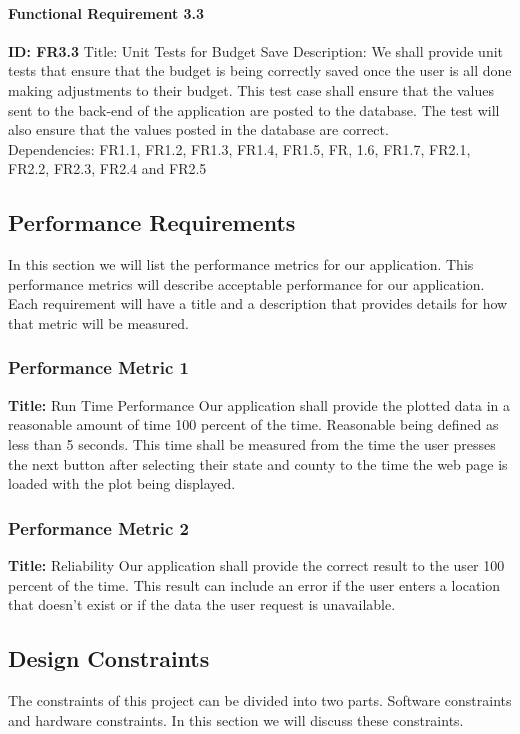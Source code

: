 \documentclass[onecolumn, draftclsnofoot,10pt, compsoc]{article}
\begin{document}
				\paragraph{Functional Requirement 3.3}
				\textbf{ID: FR3.3}\hfill \break
				Title: Unit Tests for Budget Save \hfill \break
				Description: We shall provide unit tests that ensure that the budget is being correctly saved once the user is all done making adjustments to their budget. This test case shall ensure that the values sent to the back-end of the application are posted to the database. The test will also ensure that the values posted in the database are correct.\\
				Dependencies:  FR1.1, FR1.2, FR1.3, FR1.4, FR1.5, FR, 1.6, FR1.7, FR2.1, FR2.2, FR2.3, FR2.4 and FR2.5\hfill \break

    \subsection{Performance Requirements}
    	In this section we will list the performance metrics for our application. This performance metrics will describe acceptable performance for our application. Each requirement will have a title and a description that provides details for how that metric will be measured.
				\subsubsection{Performance Metric 1}
               	\textbf{Title:} Run Time Performance \hfill \break
                Our application shall provide the plotted data in a reasonable amount of time 100 percent of the time. Reasonable being defined as less than 5 seconds. This time shall be measured from the time the user presses the next button after selecting their state and county to the time the web page is loaded with the plot being displayed.\\
                \subsubsection{Performance Metric 2}
                \textbf{Title:} Reliability \hfill \break
                Our application shall provide the correct result to the user 100 percent of the time. This result can include an error if the user enters a location that doesn't exist or if the data the user request is unavailable.\\

    \subsection{Design Constraints}
			The constraints of this project can be divided into two parts. Software constraints and hardware constraints. In this section we will discuss these constraints.\\
\end{document}
